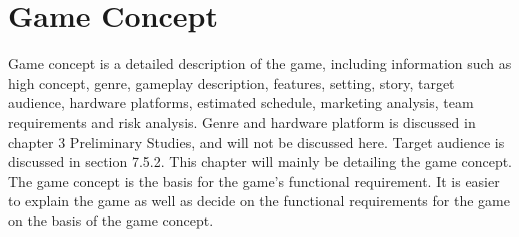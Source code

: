 \chapter{Game Concept}

	Game concept is a detailed description of the game, including information such as high concept,
	genre, gameplay description, features, setting, story, target audience, hardware platforms,
	estimated schedule, marketing analysis, team requirements and risk analysis. \cite{gameConcept}
	Genre and hardware platform is discussed in chapter 3 Preliminary Studies, and will not be
	discussed here. Target audience is discussed in section 7.5.2. This chapter will mainly be
	detailing the game concept. The game concept is the basis for the game's functional requirement.
	It is easier to explain the game as well as decide on the functional requirements for the game
	on the basis of the game concept.
